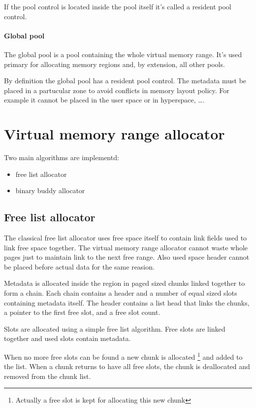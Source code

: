 If the pool control is located inside the pool itself it's called a \textsf{resident pool control}.

\paragraph{Global pool}

The global pool is a pool containing the whole virtual memory range. It's used primary for
allocating memory \textsf{region}s and, by extension, all other pools. 

By definition the global pool has a resident pool control.
The metadata must be placed in a partucular zone to avoid conflicts in 
memory layout policy. For example it cannot be placed in the user space or in hyperspace, \ldots.

\section{Virtual memory range allocator}

Two main algorithms are implementd:

\begin{itemize}
\item free list allocator
\item binary buddy allocator
\end{itemize}

\subsection{Free list allocator}

The classical free list allocator uses free space itself to contain link fields used to
link free space together. The virtual memory range allocator cannot waste whole pages
just to maintain link to the next free range. Also used space header cannot be placed before actual
data for the same reasion. 

Metadata is allocated inside the region in paged sized chunks linked together to form a chain.
Each chain contains a header and a number of equal sized slots containing metadata itself.
The header contains a list head that links the chunks, a pointer to the first free slot,
and a free slot count.

Slots are allocated using a simple free list algorithm.
Free slots are linked together and used slots contain metadata. 

When no more free slots can be found a new chunk is allocated
\footnote{Actually a free slot is kept for allocating this new chunk}
and added to the list. When a chunk returns to have all free slots, the chunk is deallocated
and removed from the chunk list.

